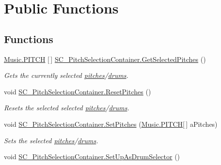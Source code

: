 \hypertarget{group___s_c___p_s_c_pub_func}{}\section{Public Functions}
\label{group___s_c___p_s_c_pub_func}
\subsection*{Functions}
\begin{DoxyCompactItemize}
\item 
\hyperlink{group___music_enums_ga508f69b199ea518f935486c990edac1d}{Music.\+P\+I\+T\+CH} \mbox{[}$\,$\mbox{]} \hyperlink{group___s_c___p_s_c_pub_func_ga05750cc6e1199f1522f8b87d6579dc34}{S\+C\+\_\+\+Pitch\+Selection\+Container.\+Get\+Selected\+Pitches} ()
\begin{DoxyCompactList}\small\item\em Gets the currently selected \hyperlink{group___music_enums_ga508f69b199ea518f935486c990edac1d}{pitches}/\hyperlink{group___music_enums_gade475b4382c7066d1af13e7c13c029b6}{drums}. \end{DoxyCompactList}\item 
void \hyperlink{group___s_c___p_s_c_pub_func_ga678ef561c5418e4bf43a5f9ed753f0f0}{S\+C\+\_\+\+Pitch\+Selection\+Container.\+Reset\+Pitches} ()
\begin{DoxyCompactList}\small\item\em Resets the selected selected \hyperlink{group___music_enums_ga508f69b199ea518f935486c990edac1d}{pitches}/\hyperlink{group___music_enums_gade475b4382c7066d1af13e7c13c029b6}{drums}. \end{DoxyCompactList}\item 
void \hyperlink{group___s_c___p_s_c_pub_func_ga0b85aab924084ebb49be4f64ad6f81e5}{S\+C\+\_\+\+Pitch\+Selection\+Container.\+Set\+Pitches} (\hyperlink{group___music_enums_ga508f69b199ea518f935486c990edac1d}{Music.\+P\+I\+T\+CH}\mbox{[}$\,$\mbox{]} a\+Pitches)
\begin{DoxyCompactList}\small\item\em Sets the selected \hyperlink{group___music_enums_ga508f69b199ea518f935486c990edac1d}{pitches}/\hyperlink{group___music_enums_gade475b4382c7066d1af13e7c13c029b6}{drums}. \end{DoxyCompactList}\item 
void \hyperlink{group___s_c___p_s_c_pub_func_ga08a0a4943359eb7f28c64aaf4cbc233c}{S\+C\+\_\+\+Pitch\+Selection\+Container.\+Set\+Up\+As\+Drum\+Selector} ()

\end{DoxyCompactItemize}
